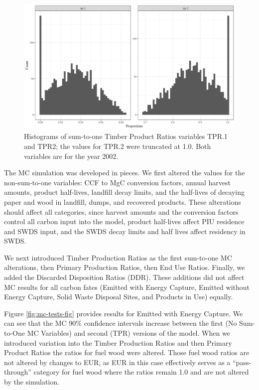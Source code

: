 \documentclass[
  openany]{book}
\begin{document}
\begin{figure}
\includegraphics[width=1\linewidth]{images/triang3} \caption{Histograms of sum-to-one Timber Product Ratios variables TPR.1 and TPR2; the values for TPR.2 were truncated at 1.0.  Both variables are for the year 2002.}\label{fig:mc-tri3-fig}
\end{figure}

The MC simulation was developed in pieces. We first altered the values for the non-sum-to-one variables: CCF to MgC conversion factors, annual harvest amounts, product half-lives, landfill decay limits, and the half-lives of decaying paper and wood in landfill, dumps, and recovered products. These alterations should affect all categories, since harvest amounts and the conversion factors control all carbon input into the model, product half-lives affect PIU residence and SWDS input, and the SWDS decay limits and half lives affect residency in SWDS.

We next introduced Timber Production Ratios as the first sum-to-one MC alterations, then Primary Production Ratios, then End Use Ratios. Finally, we added the Discarded Disposition Ratios (DDR). These additions did not affect MC results for all carbon fates (Emitted with Energy Capture, Emitted without Energy Capture, Solid Waste Disposal Sites, and Products in Use) equally.

Figure \ref{fig:mc-tests-fig} provides results for Emitted with Energy Capture. We can see that the MC 90\% confidence intervals increase between the first (No Sum-to-One MC Variables) and second (TPR) versions of the model. When we introduced variation into the Timber Production Ratios and then Primary Product Ratios the ratios for fuel wood were altered. Those fuel wood ratios are not altered by changes to EUR, as EUR in this case effectively serves as a ``pass-through'' category for fuel wood where the ratios remain 1.0 and are not altered by the simulation.
\end{document}
